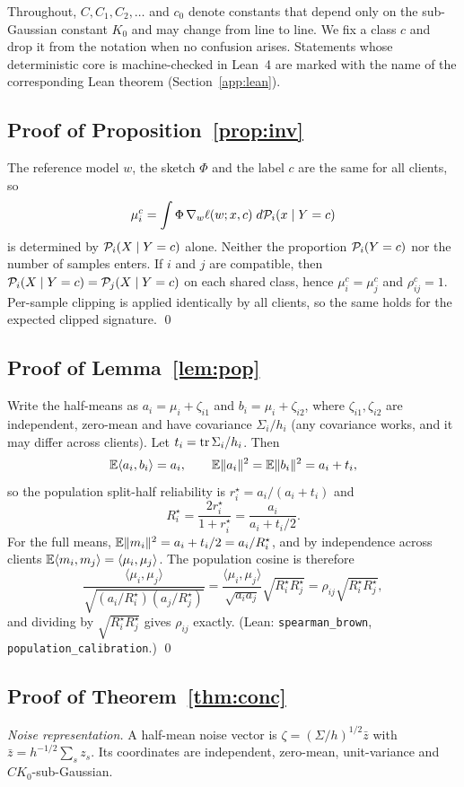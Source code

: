 Throughout, $C,C_1,C_2,\dots$ and $c_0$ denote constants that depend only on the sub-Gaussian constant $K_0$ and may change from line to line. We fix a class $c$ and drop it from the notation when no confusion arises. Statements whose deterministic core is machine-checked in Lean~4 are marked with the name of the corresponding Lean theorem (Section~\ref{app:lean}).

\subsection{Proof of Proposition~\ref{prop:inv}}
The reference model $w$, the sketch $\Phi$ and the label $c$ are the same for all clients, so
\[
\mu_i^c=\int \Phi\,\nabla_w\ell(w;x,c)\;d\mathcal{P}_i(x\mid Y=c)
\]
is determined by $\mathcal{P}_i(X\mid Y=c)$ alone. Neither the proportion $\mathcal{P}_i(Y=c)$ nor the number of samples enters. If $i$ and $j$ are compatible, then $\mathcal{P}_i(X\mid Y=c)=\mathcal{P}_j(X\mid Y=c)$ on each shared class, hence $\mu_i^c=\mu_j^c$ and $\rho^c_{ij}=1$. Per-sample clipping is applied identically by all clients, so the same holds for the expected clipped signature. \qed

\subsection{Proof of Lemma~\ref{lem:pop}}
Write the half-means as $a_i=\mu_i+\zeta_{i1}$ and $b_i=\mu_i+\zeta_{i2}$, where $\zeta_{i1},\zeta_{i2}$ are independent, zero-mean and have covariance $\Sigma_i/h_i$ (any covariance works, and it may differ across clients). Let $t_i=\operatorname{tr}\Sigma_i/h_i$. Then
\[
\mathbb{E}\langle a_i,b_i\rangle=a_i,
\qquad
\mathbb{E}\|a_i\|^2=\mathbb{E}\|b_i\|^2=a_i+t_i,
\]
so the population split-half reliability is $r_i^\star=a_i/(a_i+t_i)$ and
\[
R_i^\star=\frac{2r_i^\star}{1+r_i^\star}=\frac{a_i}{a_i+t_i/2}.
\]
For the full means, $\mathbb{E}\|m_i\|^2=a_i+t_i/2=a_i/R_i^\star$, and by independence across clients $\mathbb{E}\langle m_i,m_j\rangle=\langle\mu_i,\mu_j\rangle$. The population cosine is therefore
\[
\frac{\langle\mu_i,\mu_j\rangle}{\sqrt{(a_i/R_i^\star)(a_j/R_j^\star)}}
=\frac{\langle\mu_i,\mu_j\rangle}{\sqrt{a_ia_j}}\sqrt{R^\star_iR^\star_j}
=\rho_{ij}\sqrt{R^\star_iR^\star_j},
\]
and dividing by $\sqrt{R_i^\star R_j^\star}$ gives $\rho_{ij}$ exactly. (Lean: \texttt{spearman\_brown}, \texttt{population\_calibration}.) \qed

\subsection{Proof of Theorem~\ref{thm:conc}}
\emph{Noise representation.} A half-mean noise vector is $\zeta=(\Sigma/h)^{1/2}\bar z$ with $\bar z=h^{-1/2}\sum_{s}z_s$. Its coordinates are independent, zero-mean, unit-variance and $CK_0$-sub-Gaussian.

